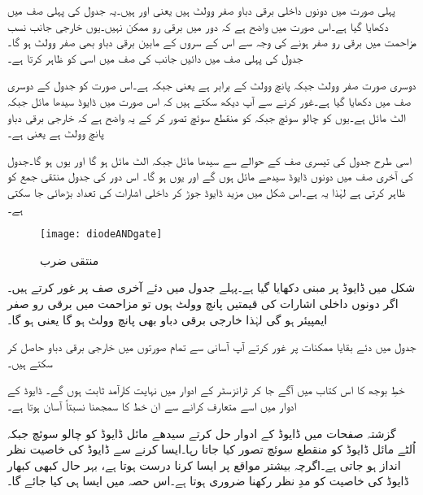 پہلی صورت میں دونوں داخلی برقی دباو صفر وولٹ ہیں یعنی  اور  ہیں۔یہ جدول کی پہلی صف میں دکھایا گیا ہے۔اس صورت میں واضح ہے کہ دور میں برقی رو ممکن نہیں۔یوں خارجی جانب نسب مزاحمت میں برقی رو صفر ہونے کی وجہ سے اس کے سروں کے مابین برقی دباو بھی صفر وولٹ ہو گا۔جدول کی پہلی صف میں دائیں جانب  کی صف میں  اسی کو ظاہر کرتا ہے۔

دوسری صورت   صفر وولٹ جبکہ   پانچ وولٹ کے برابر ہے یعنی  جبکہ  ہے۔اس صورت کو جدول کے دوسری صف میں دکھایا گیا ہے۔غور کرنے سے آپ دیکھ سکتے ہیں کہ اس صورت میں ڈایوڈ  سیدھا مائل جبکہ  الٹ مائل ہے۔یوں   کو چالو سوئچ جبکہ  کو منقطع سوئچ تصور کر کے یہ واضح ہے کہ خارجی برقی دباو پانچ وولٹ ہے یعنی   ہے۔

	اسی طرح جدول کی تیسری صف کے حوالے سے  سیدھا مائل جبکہ  الٹ مائل ہو گا اور یوں  ہو گا۔جدول کی آخری صف  میں دونوں ڈایوڈ سیدھے مائل ہوں گے اور یوں  ہو گا۔
	اس دور کی جدول منتقی جمع کو ظاہر کرتی ہے لہٰذا یہ    ہے۔اس شکل میں مزید  ڈایوڈ جوڑ کر داخلی اشارات کی تعداد بڑھائی جا سکتی ہے۔ 


\begin{figure}
\centering
\texttt{[image: diodeANDgate]}
\caption{منتقی ضرب}
\label{شکل_منتقی_ضرب}
\end{figure}
شکل  میں ڈایوڈ   پر مبنی   دکھایا گیا ہے۔پہلے جدول میں دئے آخری صف پر غور کرتے ہیں۔اگر دونوں داخلی اشارات کی قیمتیں پانچ وولٹ  ہوں تو مزاحمت میں برقی رو صفر ایمپیئر ہو گی لہٰذا خارجی برقی دباو بھی پانچ وولٹ ہو گا یعنی  ہو گا۔

جدول میں دئے بقایا ممکنات پر غور کرتے آپ آسانی سے تمام صورتوں میں خارجی برقی دباو حاصل کر سکتے ہیں۔


 \label{حصہ_یکسمتی_برقی_بار_کا_خط}
	خطِ بوجھ کا اس کتاب میں آگے جا کر ٹرانزسٹر کے ادوار میں  نہایت کارآمد ثابت ہوں گے۔ ڈایوڈ کے ادوار میں اسے متعارف کرانے سے ان خط کا سمجھنا نسبتاً آسان ہوتا ہے۔

گزشتہ صفحات میں ڈایوڈ کے ادوار حل کرتے سیدھے مائل ڈایوڈ کو چالو سوئچ جبکہ اُلٹے مائل ڈایوڈ کو منقطع سوئچ تصور کیا جاتا رہا۔ایسا کرنے سے ڈایوڈ کی خاصیت نظر انداز ہو جاتی ہے۔اگرچہ بیشتر مواقع پر ایسا کرنا درست ہوتا ہے، بہر حال کبھی کبھار ڈایوڈ کی خاصیت کو مدِ نظر رکھنا ضروری ہوتا ہے۔اس حصہ میں ایسا ہی کیا جائے گا۔

